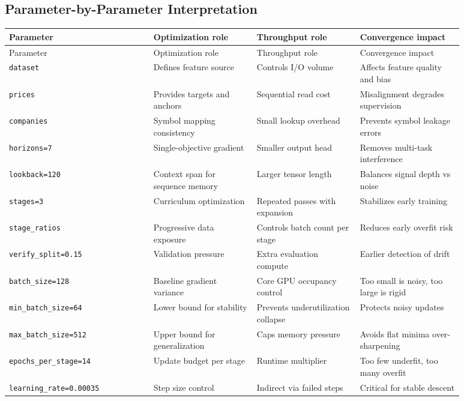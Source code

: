 \documentclass{article}
\begin{document}
\subsection{Parameter-by-Parameter Interpretation}
\setlength{\tabcolsep}{4pt}
\begin{longtable}{P{0.28\linewidth}P{0.20\linewidth}P{0.20\linewidth}P{0.20\linewidth}}
\toprule
Parameter & Optimization role & Throughput role & Convergence impact \\
\midrule
\endfirsthead
\toprule
Parameter & Optimization role & Throughput role & Convergence impact \\
\midrule
\endhead
\texttt{dataset} & Defines feature source & Controls I/O volume & Affects feature quality and bias \\
\texttt{prices} & Provides targets and anchors & Sequential read cost & Misalignment degrades supervision \\
\texttt{companies} & Symbol mapping consistency & Small lookup overhead & Prevents symbol leakage errors \\
\texttt{horizons=7} & Single-objective gradient & Smaller output head & Removes multi-task interference \\
\texttt{lookback=120} & Context span for sequence memory & Larger tensor length & Balances signal depth vs noise \\
\texttt{stages=3} & Curriculum optimization & Repeated passes with expansion & Stabilizes early training \\
\texttt{stage\_ratios} & Progressive data exposure & Controls batch count per stage & Reduces early overfit risk \\
\texttt{verify\_split=0.15} & Validation pressure & Extra evaluation compute & Earlier detection of drift \\
\texttt{batch\_size=128} & Baseline gradient variance & Core GPU occupancy control & Too small is noisy, too large is rigid \\
\texttt{min\_batch\_size=64} & Lower bound for stability & Prevents underutilization collapse & Protects noisy updates \\
\texttt{max\_batch\_size=512} & Upper bound for generalization & Caps memory pressure & Avoids flat minima over-sharpening \\
\texttt{epochs\_per\_stage=14} & Update budget per stage & Runtime multiplier & Too few underfit, too many overfit \\
\texttt{learning\_rate=0.00035} & Step size control & Indirect via failed steps & Critical for stable descent \\

\end{longtable}
\end{document}
